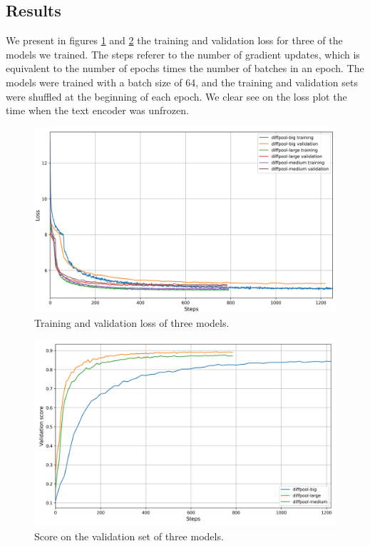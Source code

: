 \documentclass[switch, 11pt]{article}
\begin{document}
\begin{multicols}{2}

    \section{Results}

    We present in figures \ref{fig:loss} and \ref{fig:score} the training and validation loss for three of the models we trained. The steps referer to the number of gradient updates, which is equivalent to the number of epochs times the number of batches in an epoch. The models were trained with a batch size of 64, and the training and validation sets were shuffled at the beginning of each epoch. We clear see on the loss plot the time when the text encoder was unfrozen.

    \begin{figure}[H]
        \centering
        \includegraphics[width=0.8\columnwidth]{figures/loss.png}
        \caption{Training and validation loss of three models.}
        \label{fig:loss}
    \end{figure}
    \begin{figure}[H]
        \centering
        \includegraphics[width=0.8\columnwidth]{figures/score.png}
        \caption{Score on the validation set of three models.}
        \label{fig:score}
    \end{figure}


\end{multicols}
\end{document}
